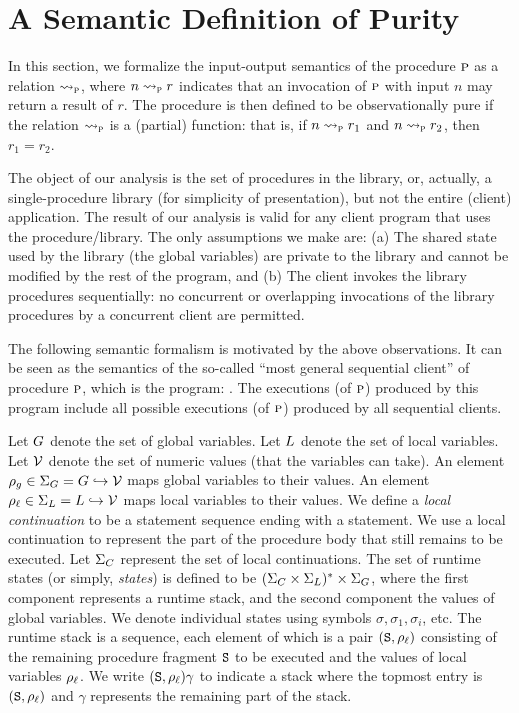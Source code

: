 \section{A Semantic Definition of Purity}
\label{sec:semantics}

In this section, we formalize the input-output semantics of the procedure $\textsc{p}$ as a relation $\rightsquigarrow_{\textsc{p}}$,
where $n \rightsquigarrow_{\textsc{p}} r$ indicates that an invocation of $\textsc{p}$ with input $n$ may return a result of $r$.
The procedure is then defined to be observationally pure if the relation $\rightsquigarrow_{\textsc{p}}$ is a (partial) function:
that is, if  $n \rightsquigarrow_{\textsc{p}} r_1$ and $n \rightsquigarrow_{\textsc{p}} r_2$, then $r_1 = r_2$.

The object of our analysis is the set of procedures in the library, or,
actually, a single-procedure library (for simplicity of presentation), but
not the entire (client) application. The result of our analysis is valid
for any client program that uses the procedure/library.  The only
assumptions we make are: (a) The shared state used by the library (the
global variables) are private to the library and cannot be modified by the
rest of the program, and (b) The client invokes the library procedures
sequentially: no concurrent or overlapping invocations of the library
procedures by a concurrent client are permitted.

The following semantic formalism is motivated by the above observations. It can be seen as the semantics
of the so-called ``most general sequential client'' of procedure $\textsc{p}$, which is the program:
.
The executions (of $\textsc{p}$) produced by this program include all possible executions (of $\textsc{p}$)  produced by all
sequential clients.

Let $G$ denote the set of global variables. Let $L$ denote the set of local variables.
Let $\mathcal{V}$ denote the set of numeric values (that the variables can take).
An element $\rho_g \in \Sigma_G = G \hookrightarrow \mathcal{V}$ maps global variables to their values.
An element $\rho_\ell \in \Sigma_L = L \hookrightarrow \mathcal{V}$ maps local variables to their values.
We define a \emph{local continuation} to be a statement sequence ending with a  statement.
We use a local continuation to represent the part of the procedure body that still remains to be
executed. Let $\Sigma_C$ represent the set of local continuations.
The set of runtime states (or simply, \emph{states}) is defined to be
$(\Sigma_C \times \Sigma_L)^* \times \Sigma_G$, where the first component
represents a runtime stack, and the second component the values of global
variables. We denote individual states using symbols $\sigma, \sigma_1,
\sigma_i$, etc. The runtime stack is a sequence, each element of which is a pair
$(\texttt{S},\rho_\ell)$ consisting of the remaining procedure fragment $\texttt{S}$ to
be executed and the values of local variables $\rho_\ell$.  We write
$(\texttt{S},\rho_\ell)\gamma$ to indicate a stack where the topmost entry is
$(\texttt{S},\rho_\ell)$ and $\gamma$ represents the remaining part of the stack.

